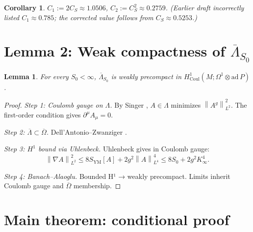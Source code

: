 \documentclass[11pt,a4paper]{amsart}
\newtheorem{lemma}[theorem]{Lemma}
\newtheorem{corollary}[theorem]{Corollary}
\theoremstyle{definition}
\newcommand{\norm}[1]{\left\lVert#1\right\rVert}
\newcommand{\Coul}{\mathrm{Coul}}
\begin{document}
\begin{corollary}\label{cor:BSconst}
$C_1 := 2 C_S \approx 1.0506$, $C_2 := C_S^{2} \approx 0.2759$. (Earlier draft incorrectly listed $C_1 \approx 0.785$; the corrected value follows from $C_S \approx 0.5253$.)
\end{corollary}

\section{Lemma 2: Weak compactness of $\overline\Lambda_{S_0}$}
\label{sec:lemma2}

\begin{lemma}\label{lem:compact}
For every $S_0 < \infty$, $\overline\Lambda_{S_0}$ is weakly precompact in $H^1_{\Coul}(M; \Omega^1\otimes \mathrm{ad}\,P)$.
\end{lemma}

\begin{proof}
\emph{Step 1: Coulomb gauge on $\Lambda$.} By Singer \cite{Singer1978}, $A \in \Lambda$ minimizes $\norm{A^g}_{L^2}^{2}$. The first-order condition gives $\partial^\mu A_\mu = 0$.

\emph{Step 2: $\overline\Lambda \subset \overline\Omega$.} Dell'Antonio--Zwanziger \cite{DellAntonioZwanziger1991}.

\emph{Step 3: $H^1$ bound via Uhlenbeck.} Uhlenbeck \cite{Uhlenbeck1982} gives in Coulomb gauge:
\[
  \norm{\nabla A}_{L^2}^{2} \leq 8 S_{\mathrm{YM}}[A] + 2 g^{2}\norm{A}_{L^4}^{4} \leq 8 S_0 + 2 g^2 K_\infty^4.
\]

\emph{Step 4: Banach--Alaoglu.} Bounded H¹ → weakly precompact. Limits inherit Coulomb gauge and $\overline\Omega$ membership.
\end{proof}

\section{Main theorem: conditional proof}\label{sec:thm}
\end{document}
